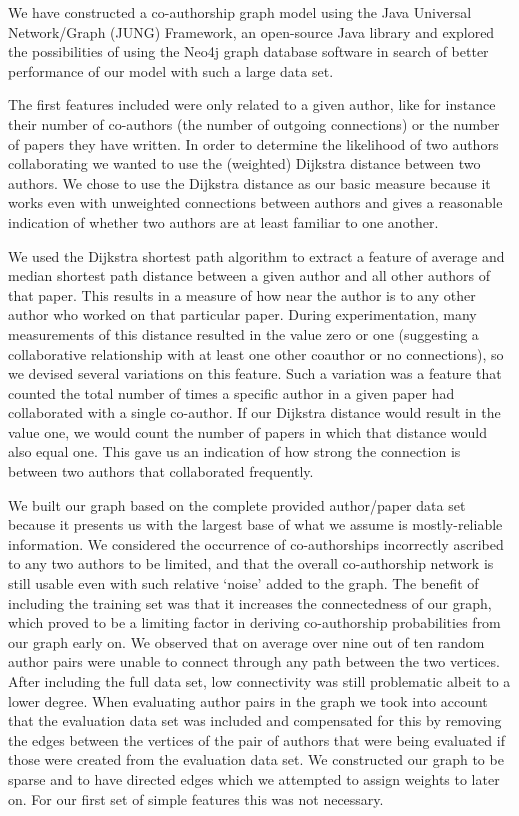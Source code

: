 We have constructed a co-authorship graph model using the Java Universal Network/Graph (JUNG) Framework, an open-source Java library \cite{o2005analysis} and explored the possibilities of using the Neo4j graph database software \cite{rodrigez2010mysql} in search of better performance of our model with such a large data set.

The first features included were only related to a given author, like for instance their number of co-authors (the number of outgoing connections) or the number of papers they have written.
In order to determine the likelihood of two authors collaborating we wanted to use the (weighted) Dijkstra distance between two authors.
We chose to use the Dijkstra distance as our basic measure because it works even with unweighted connections between authors and gives a reasonable indication of whether two authors are at least familiar to one another.

We used the Dijkstra shortest path algorithm to extract a feature of average and median shortest path distance between a given author and all other authors of that paper.
This results in a measure of how near the author is to any other author who worked on that particular paper.
During experimentation, many measurements of this distance resulted in the value zero or one (suggesting a collaborative  relationship with at least one other coauthor or no connections), so we devised several variations on this feature.
Such a variation was a feature that counted the total number of times a specific author in a given paper had collaborated with a single co-author.
If our Dijkstra distance would result in the value one, we would count the number of papers in which that distance would also equal one.
This gave us an indication of how strong the connection is between two authors that collaborated frequently.

We built our graph based on the complete provided author/paper data set because it presents us with the largest base of what we assume is mostly-reliable information.
We considered the occurrence of co-authorships incorrectly ascribed to any two authors to be limited, and that the overall co-authorship network is still usable even with such relative `noise' added to the graph.
The benefit of including the training set was that it increases the connectedness of our graph, which proved to be a limiting factor in deriving co-authorship probabilities from our graph early on.
We observed that on average over nine out of ten random author pairs were unable to connect through any path between the two vertices.
After including the full data set, low connectivity was still problematic albeit to a lower degree.
When evaluating author pairs in the graph we took into account that the evaluation data set was included and compensated for this by removing the edges between the vertices of the pair of authors that were being evaluated if those were created from the evaluation data set.
We constructed our graph to be sparse and to have directed edges which we attempted to assign weights to later on.
For our first set of simple features this was not necessary. 

